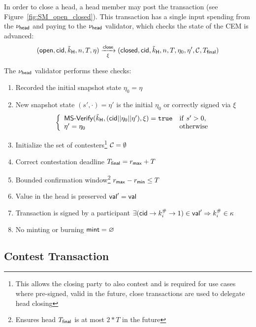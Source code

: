 In order to close a head, a head member may post the \mtxClose{} transaction
(see Figure~\ref{fig:SM_open_closed}). This transaction has a single input
spending from the $\nu_\mathsf{head}$ and paying to the $\nu_\mathsf{head}$ validator, which checks
the state of the CEM is advanced:
\[
  (\mathsf{open},\mathsf{cid},\tilde{k}_{\mathsf{H}},n,T,\eta) \xrightarrow[\xi]{\mathsf{close}} (\mathsf{closed},\mathsf{cid},\tilde{k}_{\mathsf{H}},n,T,\eta_0,\eta',\mathcal{C},T_{\mathsf{final}})
\]

\noindent The $\nu_\mathsf{head}$ validator performs these checks:
\begin{enumerate}
  \item Recorded the initial snapshot state $\eta_0 = \eta$
  \item New snapshot state $(s', \cdot) = \eta'$ is the initial $\eta_{0}$
        or correctly signed via $\xi$ \\
        \[
          \left\{\begin{array}{ll}
                  \mathsf{MS\textsf{-}{}Verify}(\tilde{k}_{\mathsf{H}},(\mathsf{cid} || \eta_{0} || \eta'),\xi) = \mathtt{true} & \mathrm{if} ~ s' > 0, \\
                  \eta' = \eta_{0} & \mathrm{otherwise}
                 \end{array}\right.
        \]
  \item Initialize the set of contesters\footnote{This allows the closing party
        to also contest and is required for use cases where pre-signed, valid in
        the future, close transactions are used to delegate head closing}
        $\mathcal{C} = \emptyset$
  \item Correct contestation deadline $T_{\mathsf{final}} = r_{\mathsf{max}} + T$
  \item Bounded confirmation window\footnote{Ensures head $T_{\mathsf{final}}$ is at most
        $2*T$ in the future} $r_{\mathsf{max}} - r_{\mathsf{min}} \leq T$
  \item Value in the head is preserved $\mathsf{val}' = \mathsf{val}$
  \item Transaction is signed by a participant $\exists (\mathsf{cid} \rightarrow k^{\#}_{i} \rightarrow 1) \in \mathsf{val}' \Rightarrow k^{\#}_{i} \in \kappa$
  \item No minting or burning $\mathsf{mint} = \varnothing$
\end{enumerate}

\subsection{Contest Transaction}\label{sec:contest-tx}




